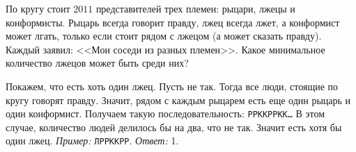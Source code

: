 По кругу стоит $2011$ представителей трех племен: рыцари, лжецы и конформисты.
Рыцарь всегда говорит правду, лжец всегда лжет, а конформист может лгать,
только если стоит рядом с лжецом (а может сказать правду).
Каждый заявил: <<Мои соседи из разных племен>>.
Какое минимальное количество лжецов может быть среди них?

\solution
Покажем, что есть хоть один лжец.
Пусть не так.
Тогда все люди, стоящие по кругу говорят правду.
Значит, рядом с каждым рыцарем есть еще один рыцарь и один конформист.
Получаем такую последовательность: \texttt{РРККРРКК\ldots}
В этом случае, количество людей делилось бы на два, что не так.
Значит есть хотя бы один лжец.
\emph{Пример:} \texttt{ЛРРККРР}.
\emph{Ответ:} 1.

